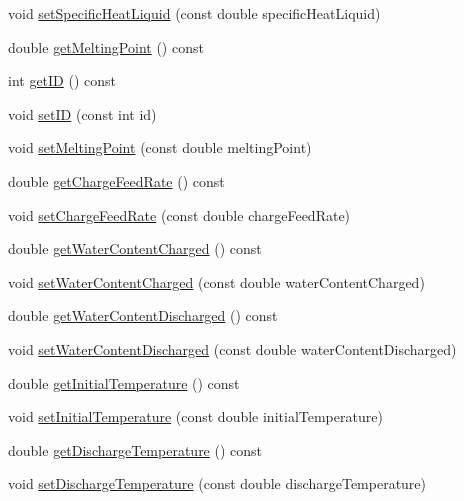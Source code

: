 \begin{DoxyCompactItemize}
\item 
void \hyperlink{class_solid_load_charge_material_a91fad347bf52a4f6695c304904091797}{set\+Specific\+Heat\+Liquid} (const double specific\+Heat\+Liquid)
\item 
double \hyperlink{class_solid_load_charge_material_a4be001f6e6ecbd2ad0ae1d154559cdb0}{get\+Melting\+Point} () const
\item 
int \hyperlink{class_solid_load_charge_material_a99a4a5d50309c37bf95cb2b446bcba04}{get\+ID} () const
\item 
void \hyperlink{class_solid_load_charge_material_a4cc8e12ffb340c94106cecf576a85ae5}{set\+ID} (const int id)
\item 
void \hyperlink{class_solid_load_charge_material_a6c235b1c49be98b02829d37af9c38cb2}{set\+Melting\+Point} (const double melting\+Point)
\item 
double \hyperlink{class_solid_load_charge_material_af6f018c5d67e94d86f2f57fecaa32b5c}{get\+Charge\+Feed\+Rate} () const
\item 
void \hyperlink{class_solid_load_charge_material_adc50117256b714789f68097437ca658d}{set\+Charge\+Feed\+Rate} (const double charge\+Feed\+Rate)
\item 
double \hyperlink{class_solid_load_charge_material_a2f99a8553d12b45bad53acc14338199a}{get\+Water\+Content\+Charged} () const
\item 
void \hyperlink{class_solid_load_charge_material_abf43422318a1b9120dff1dcfb15d5265}{set\+Water\+Content\+Charged} (const double water\+Content\+Charged)
\item 
double \hyperlink{class_solid_load_charge_material_aeeb6b341a6b5770155b85264dabbd1a7}{get\+Water\+Content\+Discharged} () const
\item 
void \hyperlink{class_solid_load_charge_material_a5104ddb43af977a751b90a0bc844d83d}{set\+Water\+Content\+Discharged} (const double water\+Content\+Discharged)
\item 
double \hyperlink{class_solid_load_charge_material_ae5d7f198fb1d4a3adb0cfc911a13ea06}{get\+Initial\+Temperature} () const
\item 
void \hyperlink{class_solid_load_charge_material_ac80e565d26e68e542f4cb41f41b7d96c}{set\+Initial\+Temperature} (const double initial\+Temperature)
\item 
double \hyperlink{class_solid_load_charge_material_afcb8c00c2e23ad1444f34960b19835a0}{get\+Discharge\+Temperature} () const
\item 
void \hyperlink{class_solid_load_charge_material_adf73bc8d656a501cae5ad68af7a7c4fb}{set\+Discharge\+Temperature} (const double discharge\+Temperature)

\end{DoxyCompactItemize}
